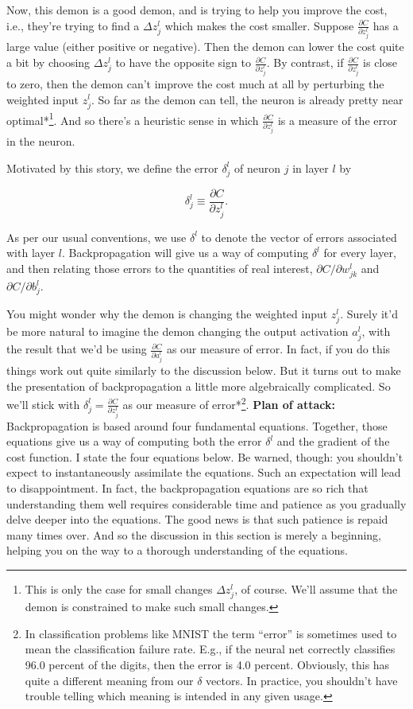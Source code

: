 Now, this demon is a good demon, and is trying to help you improve the cost, i.e., they're trying to find a $\Delta z^l_j$ which makes the cost smaller. Suppose $\frac{\partial C}{\partial z^l_j}$ has a large value (either positive or negative). Then the demon can lower the cost quite a bit by choosing $\Delta z^l_j$ to have the opposite sign to $\frac{\partial C}{\partial z^l_j}$. By contrast, if $\frac{\partial C}{\partial z^l_j}$ is close to zero, then the demon can't improve the cost much at all by perturbing the weighted input $z^l_j$. So far as the demon can tell, the neuron is already pretty near optimal*\footnote{This is only the case for small changes $\Delta z^l_j$, of course. We'll assume that the demon is constrained to make such small changes.}. And so there's a heuristic sense in which $\frac{\partial C}{\partial z^l_j}$ is a measure of the error in the neuron.


Motivated by this story, we define the error $\delta^l_j$ of neuron $j$ in layer $l$ by

\begin{equation}
\delta^l_j \equiv \frac{\partial C}{\partial z^l_j}.
\tag{29}
\end{equation}

\noindent As per our usual conventions, we use $\delta^l$ to denote the vector of errors associated with layer $l$. Backpropagation will give us a way of computing $\delta^l$ for every layer, and then relating those errors to the quantities of real interest, $\partial C / \partial w^l_{jk}$ and $\partial C / \partial b^l_j$.


You might wonder why the demon is changing the weighted input $z^l_j$. Surely it'd be more natural to imagine the demon changing the output activation $a^l_j$, with the result that we'd be using $\frac{\partial C}{\partial a^l_j}$ as our measure of error. In fact, if you do this things work out quite similarly to the discussion below. But it turns out to make the presentation of backpropagation a little more algebraically complicated. So we'll stick with $\delta^l_j = \frac{\partial C}{\partial z^l_j}$ as our measure of error*\footnote{In classification problems like MNIST the term ``error'' is sometimes used to mean the classification failure rate. E.g., if the neural net correctly classifies 96.0 percent of the digits, then the error is 4.0 percent. Obviously, this has quite a different meaning from our $\delta$ vectors. In practice, you shouldn't have trouble telling which meaning is intended in any given usage.}. \textbf{Plan of attack:} Backpropagation is based around four fundamental equations. Together, those equations give us a way of computing both the error $\delta^l$ and the gradient of the cost function. I state the four equations below. Be warned, though: you shouldn't expect to instantaneously assimilate the equations. Such an expectation will lead to disappointment. In fact, the backpropagation equations are so rich that understanding them well requires considerable time and patience as you gradually delve deeper into the equations. The good news is that such patience is repaid many times over. And so the discussion in this section is merely a beginning, helping you on the way to a thorough understanding of the equations.


